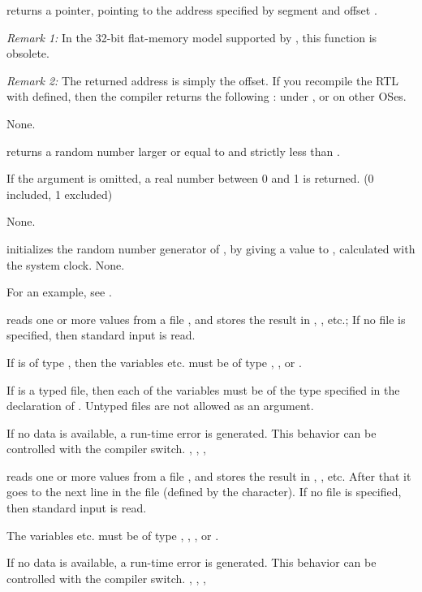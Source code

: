 \documentclass{report}
\begin{document}


{
 returns a pointer, pointing to the address specified by
segment  and offset .

{\em Remark 1:} In the 32-bit flat-memory model supported by \fpc, this
function is obsolete.

{\em Remark 2:} The returned address is simply the offset. If you recompile
the RTL with  defined, then the compiler returns the
following :  under \dos, or
 on other OSes.
}
{None.}
{}



{ returns a random number larger or equal to  and
strictly less than .

If the argument  is omitted, a real number between 0 and 1 is returned.
(0 included, 1 excluded)}
{None.}
{}




{ initializes the random number generator of \fpc, by giving
a value to , calculated with the system clock.
}
{None.}
{}

For an example, see .

{ reads one or more values from a file , and stores the
result in , , etc.; If no file  is specified, then
standard input is read.

If  is of type , then the variables  etc. must be
of type , ,  or .

If  is a typed file, then each of the variables must be of the type
specified in the declaration of . Untyped files are not allowed as an
argument.}
{If no data is available, a run-time error is generated. This behavior can
be controlled with the  compiler switch.}
{, , , }




{ reads one or more values from a file , and stores the
result in , , etc. After that it goes to the next line in
the file (defined by the  character). 
If no file  is specified, then standard input is read.

The variables  etc. must be of type , , 
,  or .
}
{If no data is available, a run-time error is generated. This behavior can
be controlled with the  compiler switch.}
{, , , }
\end{document}
